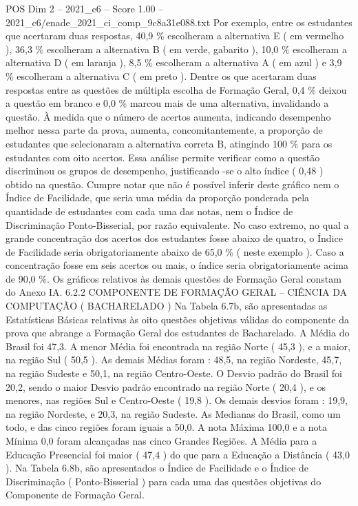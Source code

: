 \begin{textsample}{POS Dim 2 – 2021\_c6 – Score 1.00 – 2021\_c6/enade\_2021\_ci\_comp\_9c8a31e088.txt}
Por exemplo, entre os estudantes que acertaram duas respostas, 40,9 \% escolheram a alternativa E ( em vermelho ), 36,3 \% escolheram a alternativa B ( em verde, gabarito ), 10,0 \% escolheram a alternativa D ( em laranja ), 8,5 \% escolheram a alternativa A ( em azul ) e 3,9 \% escolheram a alternativa C ( em preto ).
Dentre os que acertaram duas respostas entre as questões de múltipla escolha de Formação Geral, 0,4 \% deixou a questão em branco e 0,0 \% marcou mais de uma alternativa, invalidando a questão.
À medida que o número de acertos aumenta, indicando desempenho melhor nessa parte da prova, aumenta, concomitantemente, a proporção de estudantes que selecionaram a alternativa correta B, atingindo 100 \% para os estudantes com oito acertos.
Essa análise permite verificar como a questão discriminou os grupos de desempenho, justificando -se o alto índice ( 0,48 ) obtido na questão.
Cumpre notar que não é possível inferir deste gráfico nem o Índice de Facilidade, que seria uma média da proporção ponderada pela quantidade de estudantes com cada uma das notas, nem o Índice de Discriminação Ponto-Bisserial, por razão equivalente.
No caso extremo, no qual a grande concentração dos acertos dos estudantes fosse abaixo de quatro, o Índice de Facilidade seria obrigatoriamente abaixo de 65,0 \% ( neste exemplo ).
Caso a concentração fosse em seis acertos ou mais, o índice seria obrigatoriamente acima de 90,0 \%.
Os gráficos relativos às demais questões de Formação Geral constam do Anexo IA. 6.2.2 COMPONENTE DE FORMAÇÃO GERAL – CIÊNCIA DA COMPUTAÇÃO ( BACHARELADO ) Na Tabela 6.7b, são apresentadas as Estatísticas Básicas relativas às oito questões objetivas válidas do componente da prova que abrange a Formação Geral dos estudantes de Bacharelado.
A Média do Brasil foi 47,3.
A menor Média foi encontrada na região Norte ( 45,3 ), e a maior, na região Sul ( 50,5 ).
As demais Médias foram : 48,5, na região Nordeste, 45,7, na região Sudeste e 50,1, na região Centro-Oeste.
O Desvio padrão do Brasil foi 20,2, sendo o maior Desvio padrão encontrado na região Norte ( 20,4 ), e os menores, nas regiões Sul e Centro-Oeste ( 19,8 ).
Os demais desvios foram : 19,9, na região Nordeste, e 20,3, na região Sudeste.
As Medianas do Brasil, como um todo, e das cinco regiões foram iguais a 50,0.
A nota Máxima 100,0 e a nota Mínima 0,0 foram alcançadas nas cinco Grandes Regiões.
A Média para a Educação Presencial foi maior ( 47,4 ) do que para a Educação a Distância ( 43,0 ).
Na Tabela 6.8b, são apresentados o Índice de Facilidade e o Índice de Discriminação ( Ponto-Bisserial ) para cada uma das questões objetivas do Componente de Formação Geral.

\end{textsample}
